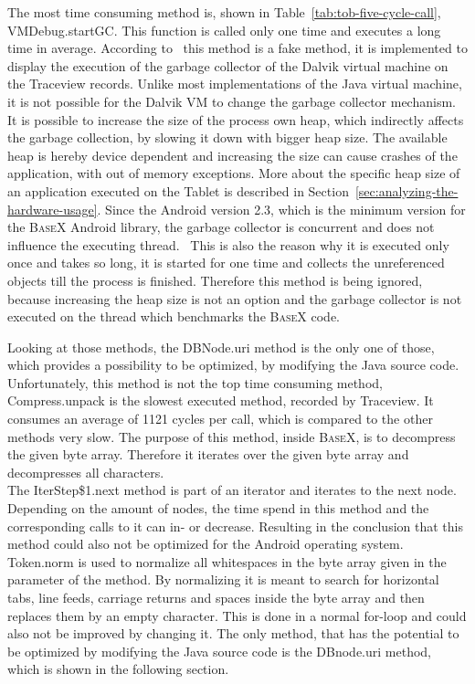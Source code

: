 The most time consuming method is, shown in Table~\ref{tab:tob-five-cycle-call}, \textsf{VMDebug.startGC}.
This function is called only one time and executes a long time in average.
According to~\cite{vmdebug-startgc} this method is a fake method, it is implemented to display the execution of the garbage collector of the Dalvik virtual machine on the Traceview records.
Unlike most implementations of the Java virtual machine, it is not possible for the Dalvik VM to change the garbage collector mechanism.
It is possible to increase the size of the process own heap, which indirectly affects the garbage collection, by slowing it down with bigger heap size.
The available heap is hereby device dependent and increasing the size can cause crashes of the application, with out of memory exceptions.
More about the specific heap size of an application executed on the Tablet is described in Section~\ref{sec:analyzing-the-hardware-usage}.
Since the Android version 2.3, which is the minimum version for the \textsc{BaseX} Android library, the garbage collector is concurrent and does not influence the executing thread.~\cite{dubroy2011memory}
This is also the reason why it is executed only once and takes so long, it is started for one time and collects the unreferenced objects till the process is finished.
Therefore this method is being ignored, because increasing the heap size is not an option and the garbage collector is not executed on the thread which benchmarks the \textsc{BaseX} code.

Looking at those methods, the \textsf{DBNode.uri} method is the only one of those, which provides a possibility to be optimized, by modifying the Java source code.
Unfortunately, this method is not the top time consuming method, \textsf{Compress.unpack} is the slowest executed method, recorded by Traceview.
It consumes an average of 1121 cycles per call, which is compared to the other methods very slow.
The purpose of this method, inside \textsc{BaseX}, is to decompress the given byte array.
Therefore it iterates over the given byte array and decompresses all characters.
\\
The \textsf{IterStep\$1.next} method is part of an iterator and iterates to the next node.
Depending on the amount of nodes, the time spend in this method and the corresponding calls to it can in- or decrease.
Resulting in the conclusion that this method could also not be optimized for the Android operating system.
\\
\textsf{Token.norm} is used to normalize all whitespaces in the byte array given in the parameter of the method.
By normalizing it is meant to search for horizontal tabs, line feeds, carriage returns and spaces inside the byte array and then replaces them by an empty character.
This is done in a normal for-loop and could also not be improved by changing it.
The only method, that has the potential to be optimized by modifying the Java source code is the \textsf{DBnode.uri} method, which is shown in the following section.


